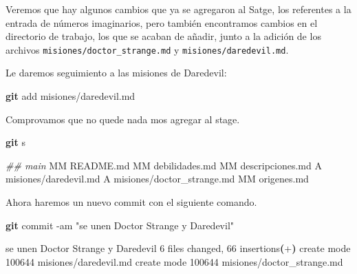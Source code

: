 \documentclass[
]{book}
\newenvironment{Shaded}{\begin{snugshade}}{\end{snugshade}}
\newcommand{\AttributeTok}[1]{\textcolor[rgb]{0.13,0.29,0.53}{#1}}
\newcommand{\CommentTok}[1]{\textcolor[rgb]{0.56,0.35,0.01}{\textit{#1}}}
\newcommand{\ErrorTok}[1]{\textcolor[rgb]{0.64,0.00,0.00}{\textbf{#1}}}
\newcommand{\ExtensionTok}[1]{#1}
\newcommand{\FunctionTok}[1]{\textcolor[rgb]{0.13,0.29,0.53}{\textbf{#1}}}
\newcommand{\KeywordTok}[1]{\textcolor[rgb]{0.13,0.29,0.53}{\textbf{#1}}}
\newcommand{\NormalTok}[1]{#1}
\newcommand{\StringTok}[1]{\textcolor[rgb]{0.31,0.60,0.02}{#1}}
\begin{document}
Veremos que hay algunos cambios que ya se agregaron al Satge, los referentes a la entrada de números imaginarios, pero también encontramos cambios en el directorio de trabajo, los que se acaban de añadir, junto a la adición de los archivos \texttt{misiones/doctor\_strange.md} y \texttt{misiones/daredevil.md}.

Le daremos seguimiento a las misiones de Daredevil:

\begin{Shaded}
\begin{Highlighting}[]
\FunctionTok{git}\NormalTok{ add misiones/daredevil.md}
\end{Highlighting}
\end{Shaded}

Comprovamos que no quede nada mos agregar al stage.

\begin{Shaded}
\begin{Highlighting}[]
\FunctionTok{git}\NormalTok{ s}
\end{Highlighting}
\end{Shaded}

\begin{Shaded}
\begin{Highlighting}[]
\CommentTok{\#\# main}
\ExtensionTok{MM}\NormalTok{ README.md}
\ExtensionTok{MM}\NormalTok{ debilidades.md}
\ExtensionTok{MM}\NormalTok{ descripciones.md}
\ExtensionTok{A}\NormalTok{  misiones/daredevil.md}
\ExtensionTok{A}\NormalTok{  misiones/doctor\_strange.md}
\ExtensionTok{MM}\NormalTok{ origenes.md}
\end{Highlighting}
\end{Shaded}

Ahora haremos un nuevo commit con el siguiente comando.

\begin{Shaded}
\begin{Highlighting}[]
\FunctionTok{git}\NormalTok{ commit }\AttributeTok{{-}am} \StringTok{"se unen Doctor Strange y Daredevil"}
\end{Highlighting}
\end{Shaded}

\begin{Shaded}
\begin{Highlighting}[]
\ExtensionTok{[main}\NormalTok{ 8727c32] se unen Doctor Strange y Daredevil}
 \ExtensionTok{6}\NormalTok{ files changed, 66 insertions}\ErrorTok{(}\ExtensionTok{+}\KeywordTok{)}
 \ExtensionTok{create}\NormalTok{ mode 100644 misiones/daredevil.md}
 \ExtensionTok{create}\NormalTok{ mode 100644 misiones/doctor\_strange.md}
\end{Highlighting}
\end{Shaded}
\end{document}
